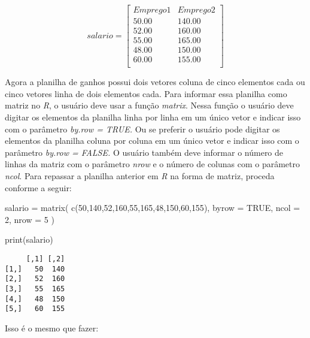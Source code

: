 \documentclass[
  letterpaper,
  DIV=11,
  numbers=noendperiod]{scrreprt}
\newenvironment{Shaded}{\begin{snugshade}}{\end{snugshade}}
\newcommand{\AttributeTok}[1]{\textcolor[rgb]{0.40,0.45,0.13}{#1}}
\newcommand{\ConstantTok}[1]{\textcolor[rgb]{0.56,0.35,0.01}{#1}}
\newcommand{\DecValTok}[1]{\textcolor[rgb]{0.68,0.00,0.00}{#1}}
\newcommand{\FunctionTok}[1]{\textcolor[rgb]{0.28,0.35,0.67}{#1}}
\newcommand{\NormalTok}[1]{\textcolor[rgb]{0.00,0.23,0.31}{#1}}
\newcommand{\OtherTok}[1]{\textcolor[rgb]{0.00,0.23,0.31}{#1}}
\begin{document}
\[
salario = \left[
\begin{array}{cc}
Emprego 1 & Emprego 2\\ \hline
50.00 & 140.00\\
52.00 & 160.00\\
55.00 & 165.00\\
48.00 & 150.00\\
60.00 & 155.00 \\
\end{array}
\right]
\]

Agora a planilha de ganhos possui dois vetores coluna de cinco elementos
cada ou cinco vetores linha de dois elementos cada. Para informar essa
planilha como matriz no \emph{R}, o usuário deve usar a função
\emph{matrix}. Nessa função o usuário deve digitar os elementos da
planilha linha por linha em um único vetor e indicar isso com o
parâmetro \emph{by.row = TRUE.} Ou se preferir o usuário pode digitar os
elementos da planilha coluna por coluna em um único vetor e indicar isso
com o parâmetro \emph{by.row = FALSE.} O usuário também deve informar o
número de linhas da matriz com o parâmetro \emph{nrow} e o número de
colunas com o parâmetro \emph{ncol}. Para repassar a planilha anterior
em \emph{R} na forma de matriz, proceda conforme a seguir:

\begin{Shaded}
\begin{Highlighting}[]
\NormalTok{salario }\OtherTok{=} \FunctionTok{matrix}\NormalTok{(}
  \FunctionTok{c}\NormalTok{(}\DecValTok{50}\NormalTok{,}\DecValTok{140}\NormalTok{,}\DecValTok{52}\NormalTok{,}\DecValTok{160}\NormalTok{,}\DecValTok{55}\NormalTok{,}\DecValTok{165}\NormalTok{,}\DecValTok{48}\NormalTok{,}\DecValTok{150}\NormalTok{,}\DecValTok{60}\NormalTok{,}\DecValTok{155}\NormalTok{),}
  \AttributeTok{byrow =} \ConstantTok{TRUE}\NormalTok{,}
  \AttributeTok{ncol =} \DecValTok{2}\NormalTok{,}
  \AttributeTok{nrow =} \DecValTok{5}
\NormalTok{)}

\FunctionTok{print}\NormalTok{(salario)}
\end{Highlighting}
\end{Shaded}

\begin{verbatim}
     [,1] [,2]
[1,]   50  140
[2,]   52  160
[3,]   55  165
[4,]   48  150
[5,]   60  155
\end{verbatim}

Isso é o mesmo que fazer:
\end{document}
